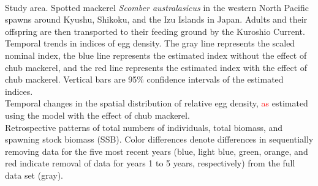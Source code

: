 \documentclass[12pt]{article}
\begin{document}
\begin{linenumbers}
\newpage
{}\\
 Study area. Spotted mackerel \textit{Scomber australasicus} in the western North Pacific spawns around Kyushu, Shikoku, and the Izu Islands in Japan. Adults and their offspring are then transported to their feeding ground by the Kuroshio Current.
\ \\
 Temporal trends in indices of egg density. The gray line represents the scaled nominal index, the blue line represents the estimated index without the effect of chub mackerel, and the red line represents the estimated index with the effect of chub mackerel. Vertical bars are 95\% confidence intervals of the estimated indices.
\ \\
 Temporal changes in the spatial distribution of relative egg density, \textcolor{red}{as} estimated using the model with the effect of chub mackerel.
\ \\
 Retrospective patterns of total numbers of individuals, total biomass, and spawning stock biomass (SSB). Color differences denote differences in sequentially removing data for the five most recent years (blue, light blue, green, orange, and red indicate removal of data for years 1 to 5 years, respectively) from the full data set (gray).
\ \\



\end{linenumbers}
\end{document}
